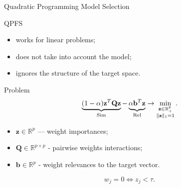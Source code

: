\documentclass[9pt]{beamer}
\newcommand{\bz}{\mathbf{z}}
\newcommand{\bQ}{\mathbf{Q}}
\newcommand{\bbR}{\mathbb{R}}
\begin{document}
\begin{frame}{Quadratic Programming Model Selection}
	\begin{block}{QPFS}
		\begin{itemize}
			\item works for linear problems;
			\item does not take into account the model;
			\item ignores the structure of the target space.
		\end{itemize}
	\end{block}
	\begin{block}{Problem}
		\begin{equation*}
			\underbrace{(1 - \alpha) \bz^{T} \bQ \bz}_{\text{Sim}} - \underbrace{\vphantom{()}\alpha \mathbf{b}^{T} \bz}_{\text{Rel}} \rightarrow \min_{\substack{\bz \in \bbR^p_+ \\ \|\bz\|_1 = 1}}.
		\end{equation*}
	\end{block}
	\begin{itemize}
		\item $\bz \in \bbR^p$ --- weight importances;
		\item $\bQ \in \bbR^{p \times p}$ - pairwise weights interactions;
		\item $\mathbf{b} \in \bbR^p$ - weight relevances to the target vector.
	\end{itemize}
	\begin{equation*}
		w_j = 0 \Leftrightarrow z_j < \tau.
	\end{equation*}
\end{frame}
\end{document}
